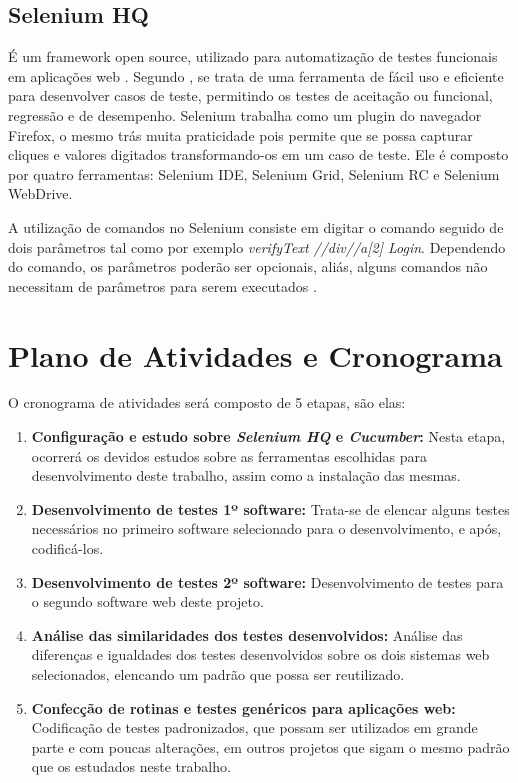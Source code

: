 \documentclass[12pt]{article}
\begin{document}
	\subsection{Selenium HQ}
	É um framework open source, utilizado para automatização de testes funcionais em aplicações web \cite{chiavegatto1desenvolvimento}. Segundo \citeauthor{pereiraestudoselenium} \cite{pereiraestudoselenium}, se trata de uma ferramenta de fácil uso e eficiente para desenvolver casos de teste, permitindo os testes de aceitação ou funcional, regressão e de desempenho. 
	Selenium trabalha como um plugin do navegador Firefox, o mesmo trás muita praticidade pois permite que se possa capturar cliques e valores digitados transformando-os em um caso de teste. Ele é composto por quatro ferramentas: Selenium IDE, Selenium Grid, Selenium RC e Selenium WebDrive. 
	
	A  utilização  de  comandos  no  Selenium  consiste  em  digitar  o  comando  seguido  de  dois parâmetros  tal  como  por  exemplo \emph{verifyText //div//a[2] Login}. Dependendo  do  comando,  os parâmetros poderão ser opcionais, aliás, alguns comandos não necessitam de parâmetros para serem executados \cite{sixpenceautomatizaccao}.

	\section{Plano de Atividades e Cronograma}

	O cronograma de atividades será composto de 5 etapas, são elas:
	
	\begin{enumerate}
		\item \label{activity:configuracao} \textbf{Configuração e estudo sobre \emph{Selenium HQ} e \emph{Cucumber}:}
		Nesta etapa, ocorrerá os devidos estudos sobre as ferramentas escolhidas para
		desenvolvimento deste trabalho, assim como a instalação das mesmas.
		\item \label{activity:desenvolvimento_1} \textbf{Desenvolvimento de testes 1º software:}
		Trata-se de elencar alguns testes necessários no primeiro software selecionado para o desenvolvimento,
		e após, codificá-los.
		\item \label{activity:desenvolvimento_2} \textbf{Desenvolvimento de testes 2º software:}
		Desenvolvimento de testes para o segundo software web deste projeto.
		\item \label{activity:analise} \textbf{Análise das similaridades dos testes desenvolvidos:}
		Análise das diferenças e igualdades dos testes desenvolvidos sobre os dois sistemas web selecionados,
		elencando um padrão que possa ser reutilizado.
		\item \label{activity:final} \textbf{Confecção de rotinas e testes genéricos para aplicações web:}
		Codificação de testes padronizados, que possam ser utilizados em grande parte e com poucas alterações,
		em outros projetos que sigam o mesmo padrão que os estudados neste trabalho.
	\end{enumerate}
\end{document}
